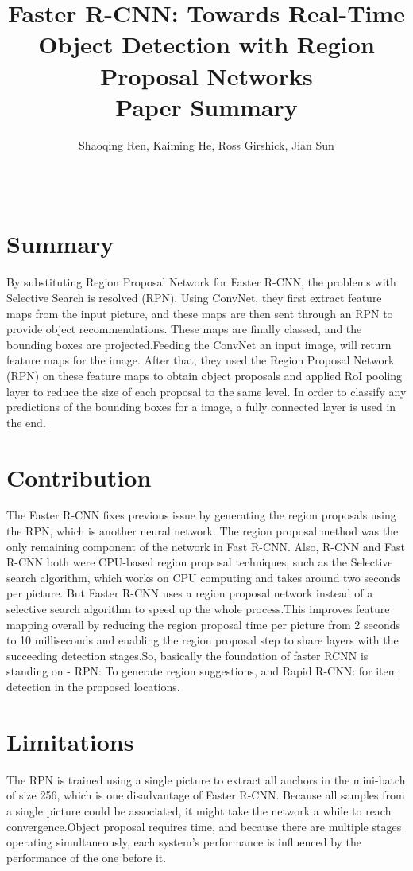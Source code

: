 \documentclass{article}
\title{Faster R-CNN: Towards Real-Time Object Detection with Region Proposal Networks
\large 
\\Paper Summary}
\author{Shaoqing Ren, Kaiming He, Ross Girshick, Jian Sun \\
  \small 
\\\\
}
\date{\vspace{-5ex}}
\begin{document}
\maketitle

\section{Summary}
By substituting Region Proposal Network for Faster R-CNN, the problems with Selective Search is resolved (RPN). Using ConvNet, they first extract feature maps from the input picture, and these maps are then sent through an RPN to provide object recommendations. These maps are finally classed, and the bounding boxes are projected.Feeding the ConvNet an input image, will return feature maps for the image. After that, they used the Region Proposal Network (RPN) on these feature maps to obtain object proposals and applied RoI pooling layer to reduce the size of each proposal to the same level. In order to classify any predictions of the bounding boxes for a image, a fully connected layer is used in the end.

\section{Contribution}
The Faster R-CNN fixes previous issue by generating the region proposals using the RPN, which is another neural network. The region proposal method was the only remaining component of the network in Fast R-CNN. Also, R-CNN and Fast R-CNN both were CPU-based region proposal techniques, such as the Selective search algorithm, which works on CPU computing and takes around two seconds per picture. But Faster R-CNN uses a region proposal network instead of a selective search algorithm to speed up the whole process.This improves feature mapping overall by reducing the region proposal time per picture from 2 seconds to 10 milliseconds and enabling the region proposal step to share layers with the succeeding detection stages.So, basically the foundation of faster RCNN is standing on - RPN: To generate region suggestions, and Rapid R-CNN: for item detection in the proposed locations.

\section{Limitations}
The RPN is trained using a single picture to extract all anchors in the mini-batch of size 256, which is one disadvantage of Faster R-CNN. Because all samples from a single picture could be associated, it might take the network a while to reach convergence.Object proposal requires time, and because there are multiple stages operating simultaneously, each system's performance is influenced by the performance of the one before it.
\end{document}
